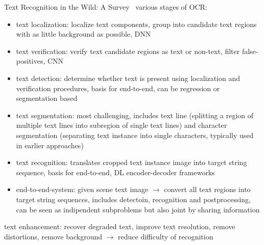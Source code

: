 Text Recognition in the Wild: A Survey~\citep{chen_text_2021}
various stages of \ac{OCR}:
\begin{itemize}
    \item text localization: localize text components, group into candidate text regions with
        as little background as possible, DNN
    \item text verification: verify text candidate regions as text or non-text,
        filter false-positives, CNN
    \item text detection: determine whether text is present using localization and verification
        procedures, basis for end-to-end, can be regression or segmentation based
    \item text segmentation: most challenging, includes text line (splitting a region of multiple
        text lines into subregion of single text lines) and character segmentation (separating
        text instance into single characters, typically used in earlier approaches)
    \item text recognition: translates cropped text instance image into target string sequence,
        basis for end-to-end, DL encoder-decoder frameworks
    \item end-to-end-system: given scene text image $\rightarrow$ convert all text regions into
        target string sequences, includes detectoin, recognition and postprocessing, can be
        seen as indipendent subproblems but also joint by sharing information
\end{itemize}

text enhancement: recover degraded text, improve text resolution, remove distortions,
remove background $\rightarrow$ reduce difficulty of recognition

